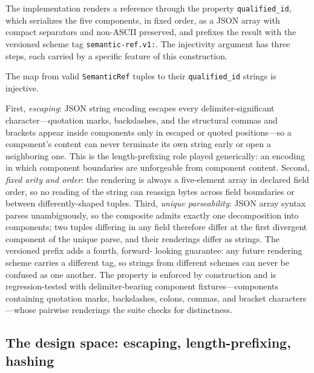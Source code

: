 The implementation renders a reference through the property
\texttt{qualified\_id}, which serializes the five components, in
fixed order, as a JSON array with compact separators and
non-ASCII preserved, and prefixes the result with the versioned
scheme tag \texttt{semantic-ref.v1:}. The injectivity argument has
three steps, each carried by a specific feature of this
construction.

\begin{proposition}\label{ch03:prop-injective}
The map from valid \texttt{SemanticRef} tuples to their
\texttt{qualified\_id} strings is injective.
\end{proposition}

\begin{designargument}
First, \emph{escaping}: JSON string encoding escapes every
delimiter-significant character---quotation marks, backslashes,
and the structural commas and brackets appear inside components
only in escaped or quoted positions---so a component's content can
never terminate its own string early or open a neighboring one.
This is the length-prefixing role played generically: an encoding
in which component boundaries are unforgeable from component
content. Second, \emph{fixed arity and order}: the rendering is
always a five-element array in declared field order, so no
reading of the string can reassign bytes across field boundaries
or between differently-shaped tuples. Third, \emph{unique
parseability}: JSON array syntax parses unambiguously, so the
composite admits exactly one decomposition into components; two
tuples differing in any field therefore differ at the first
divergent component of the unique parse, and their renderings
differ as strings. The versioned prefix adds a fourth, forward-
looking guarantee: any future rendering scheme carries a
different tag, so strings from different schemes can never be
confused as one another. The property is enforced by construction
and is regression-tested with delimiter-bearing component
fixtures---components containing quotation marks, backslashes,
colons, commas, and bracket characters---whose pairwise renderings
the suite checks for distinctness.
\end{designargument}

\subsection{The design space: escaping, length-prefixing, hashing}\label{ch03:renderspace}

